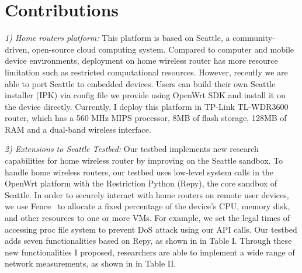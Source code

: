 \documentclass[conference]{IEEEtran}   	%
\begin{document}
\section{Contributions}
\label{sec.contributions}
\textit{1) Home routers platform:} This platform is based on Seattle\cite{zhuang2013experience}, a community-driven, open-source cloud computing system. Compared to computer and mobile device environments, deployment on home wireless router has more resource limitation such as restricted computational resources. However, recently we are able to port Seattle to embedded devices. Users can build their own Seattle installer (IPK) via config file we provide using OpenWrt SDK and install it on the device directly. Currently, I deploy this platform in TP-Link TL-WDR3600 router, which has a 560 MHz MIPS processor, 8MB of flash storage, 128MB of RAM and a dual-band wireless interface.
\newline

\textit{2) Extensions to Seattle Testbed:}  Our testbed implements new research capabilities for home wireless router by improving on the Seattle sandbox. To handle home wireless routers, our testbed uses low-level system calls in the OpenWrt platform\cite{openwrt} with the Restriction Python (Repy)\cite{cappos2010retaining}, the core sandbox of Seattle. In order to securely interact with home routers on remote user devices, we use Fence~\cite{li2015fence} to allocate a fixed percentage of the device's CPU, memory disk, and other resources to one or more VMs. For example, we set the legal times of accessing proc file system to prevent DoS attack using our API calls. Our testbed adds seven functionalities based on Repy, as shown in in Table I. Through these new functionalities I proposed, researchers are able to implement a wide range of network measurements, as shown in in Table II.
\newline
\end{document}
